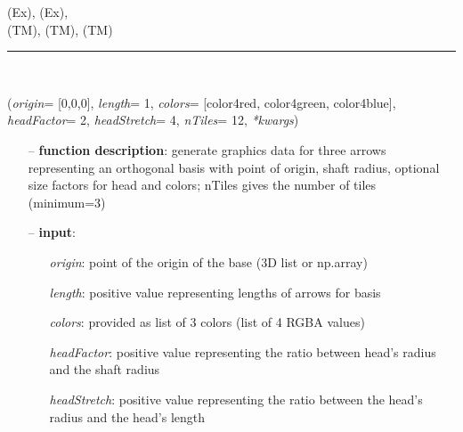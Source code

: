 \begin{itemize}[leftmargin=1.4cm]
\begin{itemize}[leftmargin=1.4cm]
\begin{itemize}[leftmargin=0.5cm]
\begin{itemize}[leftmargin=1.4cm]
\begin{itemize}[leftmargin=1.4cm]
\begin{itemize}[leftmargin=0.5cm]
\begin{itemize}[leftmargin=1.4cm]
\begin{itemize}[leftmargin=0.5cm]
 (Ex), 
 (Ex), 
\\  (TM), 
 (TM), 
 (TM)\ei

%
\noindent\rule{8cm}{0.75pt}\vspace{1pt} \\ 
\begin{flushleft}
\label{sec:graphicsDataUtilities:GraphicsDataBasis}
({\it origin}= [0,0,0], {\it length}= 1, {\it colors}= [color4red, color4green, color4blue], {\it headFactor}= 2, {\it headStretch}= 4, {\it nTiles}= 12, {\it **kwargs})
\end{flushleft}
\setlength{\itemindent}{0.7cm}
\begin{itemize}[leftmargin=0.7cm]
  \item[--]  {\bf function description}: generate graphics data for three arrows representing an orthogonal basis with point of origin, shaft radius, optional size factors for head and colors; nTiles gives the number of tiles (minimum=3)  \item[--]  {\bf input}: \vspace{-6pt}
  \begin{itemize}[leftmargin=1.2cm]
\setlength{\itemindent}{-0.7cm}
    \item[] {\it origin}: point of the origin of the base (3D list or np.array)
    \item[] {\it   length}: positive value representing lengths of arrows for basis
    \item[] {\it   colors}: provided as list of 3 colors (list of 4 RGBA values)
    \item[] {\it   headFactor}: positive value representing the ratio between head's radius and the shaft radius
    \item[] {\it   headStretch}: positive value representing the ratio between the head's radius and the head's length

\end{itemize}
\end{itemize}
\end{itemize}
\end{itemize}
\end{itemize}
\end{itemize}
\end{itemize}
\end{itemize}
\end{itemize}
\end{itemize}
